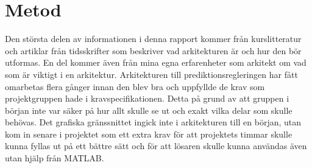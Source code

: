 \section{Metod}
Den största delen av informationen i denna rapport kommer från kurslitteratur och artiklar från tidsskrifter som beskriver vad arkitekturen är och hur den bör utformas. En del kommer även från mina egna erfarenheter som arkitekt om vad som är viktigt i en arkitektur.
\newline
\newline
Arkitekturen till prediktionsregleringen har fått omarbetas flera gånger innan den blev bra och uppfyllde de krav som projektgruppen hade i kravspecifikationen. Detta på grund av att gruppen i början inte var säker på hur allt skulle se ut och exakt vilka delar som skulle behövas. Det grafiska gränssnittet ingick inte i arkitekturen till en början, utan kom in senare i projektet som ett extra krav för att projektets timmar skulle kunna fyllas ut på ett bättre sätt och för att lösaren skulle kunna användas även utan hjälp från MATLAB.

 

